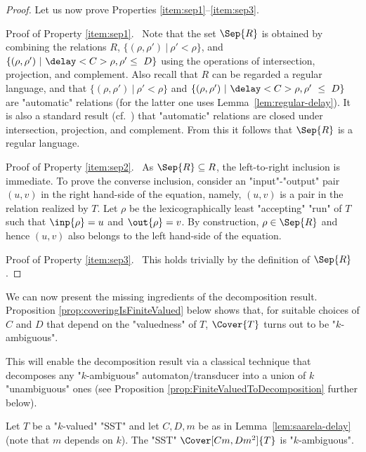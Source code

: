 \documentclass{theoretics}
\begin{document}
\begin{proof}
Let us now prove Properties \ref{item:sep1}--\ref{item:sep3}.


\smallskip\noindent
{\sc Proof of Property \ref{item:sep1}.}~
Note that the set $\Sep{R}$ is obtained 
by combining the relations $R$, 
$\{ (\rho,\rho') ~|~ \rho' < \rho\}$, and
$\{ (\rho,\rho') ~|~ \delay<C>{\rho,\rho'} \leq~D\}$ 
using the operations of intersection, projection, and complement.
Also recall that $R$ can be regarded a regular language, and that
$\{ (\rho,\rho') ~|~ \rho' < \rho\}$ and
$\{ (\rho,\rho') ~|~ \delay<C>{\rho,\rho'}~\leq ~D\}$
are "automatic" relations (for the latter one uses Lemma~\ref{lem:regular-delay}).
It is also a standard result (cf.~\cite{Hodgson83,KhoussainovN95,BlumensathG00})
that "automatic" relations are closed under intersection, projection, and
complement.
From this it follows that $\Sep{R}$ is a regular language.



\smallskip\noindent
{\sc Proof of Property \ref{item:sep2}.}~
As $\Sep{R} \subseteq R$, the left-to-right inclusion is immediate.
To prove the converse inclusion,
consider an "input"-"output" pair $(u,v)$ in the right hand-side of the equation,
namely, $(u,v)$ is a pair in the relation realized by $T$.
Let $\rho$ be the lexicographically least "accepting" "run" of $T$
such that $\inp{\rho}=u$ and $\out{\rho}=v$.
By construction, $\rho\in\Sep{R}$ and hence $(u,v)$ also belongs to the
left hand-side of the equation.


\smallskip\noindent
{\sc Proof of Property \ref{item:sep3}.}~
This holds trivially by the definition of $\Sep{R}$.
\end{proof}

We can now present the missing ingredients of the decomposition result.
Proposition \ref{prop:coveringIsFiniteValued} below
shows that, for suitable choices of $C$ and $D$
that depend on the "valuedness" of $T$, 
$\Cover{T}$ turns out to be "$k$-ambiguous".

This will enable the decomposition result
via a classical technique that decomposes any 
"$k$-ambiguous" automaton/transducer into a 
union of $k$ "unambiguous" ones
(see Proposition \ref{prop:FiniteValuedToDecomposition}
further below). 


\begin{proposition}\label{prop:coveringIsFiniteValued}
Let $T$ be a "$k$-valued" "SST" and let $C,D,m$ be
as in Lemma~\ref{lem:saarela-delay} (note that $m$ depends on $k$).
The "SST" $\Cover[Cm,Dm^2]{T}$ is "$k$-ambiguous".
\end{proposition}
\end{document}
